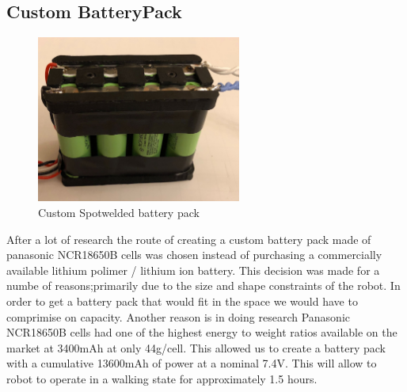 \subsection{Custom BatteryPack}
\begin{figure}[H]
       \centering
       \includegraphics[width=0.6\textwidth]{figures/CustomBatteryPack.jpg}
       \caption{Custom Spotwelded battery pack}
       \label{fig:CustomBatteryPack}
   \end{figure}
   After a lot of research the route of creating a custom battery pack made of panasonic NCR18650B cells was chosen instead of purchasing a commercially available lithium polimer / lithium ion battery. This decision was made for a numbe of reasons;primarily due to the size and shape constraints of the robot. In order to get a battery pack that would fit in the space we would have to comprimise on capacity. Another reason is in doing research Panasonic NCR18650B cells had one of the highest energy to weight ratios available on the market at 3400mAh at only 44g/cell. This allowed us to create a battery pack with a cumulative 13600mAh of power at a nominal 7.4V. This will allow to robot to operate in a walking state for approximately 1.5 hours.
